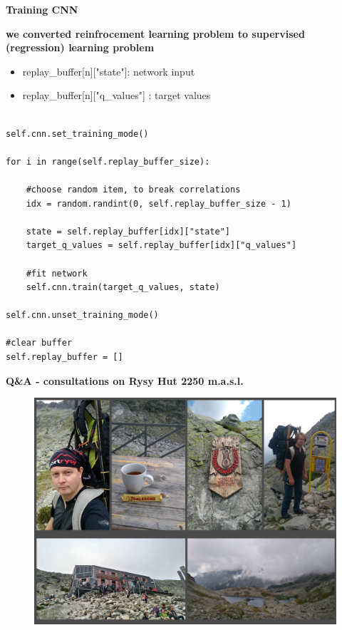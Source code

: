 \documentclass[xcolor=dvipsnames]{beamer}
\begin{document}
\begin{frame}[fragile]
{\bf Training CNN}

{\bf we converted reinfrocement learning problem to supervised (regression) learning problem}

\begin{itemize}
    \item replay\_buffer[n]["state"]: network input
    \item replay\_buffer[n]["q\_values"] : target values
\end{itemize}


\begin{lstlisting}

self.cnn.set_training_mode()

for i in range(self.replay_buffer_size):

    #choose random item, to break correlations
    idx = random.randint(0, self.replay_buffer_size - 1)

    state = self.replay_buffer[idx]["state"]
    target_q_values = self.replay_buffer[idx]["q_values"]

    #fit network
    self.cnn.train(target_q_values, state)

self.cnn.unset_training_mode()

#clear buffer
self.replay_buffer = []

\end{lstlisting}

\end{frame}




\begin{frame}{\bf Q\&A - consultations on Rysy Hut 2250 m.a.s.l.}
 \vspace{-6mm}
\begin{figure}
  \includegraphics[scale=0.5]{./pictures/me_rysy.jpg}
\end{figure}

\end{frame}
\end{document}
